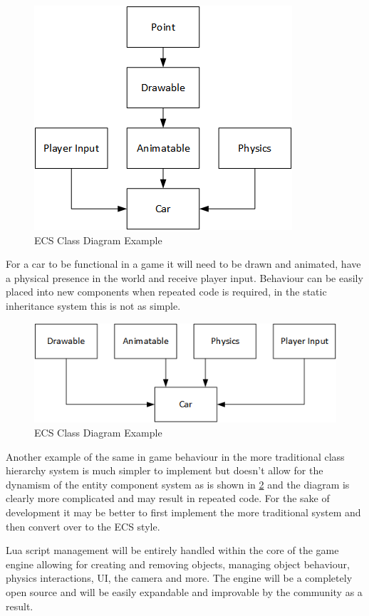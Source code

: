 \documentclass[11pt,a4paper,titlepage]{article}
\begin{document}
	\begin{figure}[h] 
		\centering
		\includegraphics[scale=0.75]{ECS1}
		\caption{ECS Class Diagram Example}
		\label{fig:ClassDiagram1}
	\end{figure}

	For a car to be functional in a game it will need to be drawn and animated, have a physical presence in the world and receive player input. Behaviour can be easily placed into new components when repeated code is required, in the static inheritance system this is not as simple.

	\begin{figure}[h]
		\centering
		\includegraphics[scale=0.75]{ECS2}
		\caption{ECS Class Diagram Example}
		\label{fig:ClassDiagram2}
	\end{figure}

	Another example of the same in game behaviour in the more traditional class hierarchy system is much simpler to implement but doesn't allow for the dynamism of the entity component system as is shown in \ref{fig:ClassDiagram2} and the diagram is clearly more complicated and may result in repeated code. For the sake of development it may be better to first implement the more traditional system and then convert over to the ECS style.

	Lua script management will be entirely handled within the core of the game engine allowing for creating and removing objects, managing object behaviour, physics interactions, UI, the camera and more. The engine will be a completely open source and will be easily expandable and improvable by the community as a result.
\end{document}
